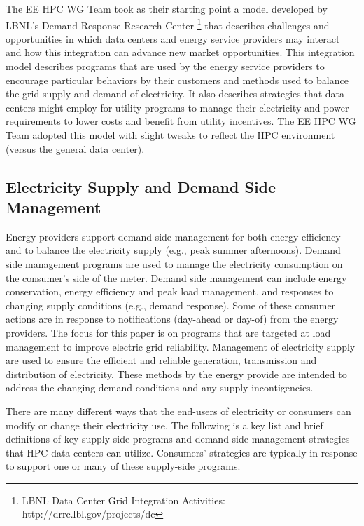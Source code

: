 The EE HPC WG Team took as their starting point a model developed by LBNL's 
Demand Response Research Center \footnote{LBNL
Data Center Grid Integration Activities: http://drrc.lbl.gov/projects/dc} that
describes challenges and opportunities in which data centers and energy service providers may
interact and how this integration can advance new market opportunities. This
integration model describes programs that are used by the energy service
providers to encourage particular behaviors by their customers and methods used
to balance the grid supply and demand of electricity. It also describes
strategies that data centers might employ for utility programs to manage their
electricity and power requirements to lower costs and benefit from utility incentives. The EE HPC WG Team adopted
this model with slight tweaks to reflect the HPC environment (versus the
general data center).


\subsection{Electricity Supply and Demand Side Management}

Energy providers support demand-side management for both energy efficiency and to balance the electricity supply (e.g., peak summer afternoons). 
Demand side management programs are used to manage the electricity consumption on the consumer’s side of the meter.  
Demand side management can include energy conservation, energy efficiency and peak load management, and responses to 
changing supply conditions (e.g., demand response). Some of these consumer actions are in response to notifications (day-ahead or day-of) from the energy providers. The focus for this paper is on programs that are targeted at load management to improve electric grid reliability. 
Management of electricity supply are used to ensure the efficient and reliable generation, transmission and distribution of 
electricity.  
These methods by the energy provide are intended to address the changing demand conditions and any supply incontigencies. 

There are many different ways that the end-users of electricity or consumers can modify or change their electricity use. 
The following is a key list and 
brief definitions of key supply-side programs and demand-side management strategies that HPC data centers can utilize. 
Consumers' strategies are typically in response to support one or many of these supply-side programs.



